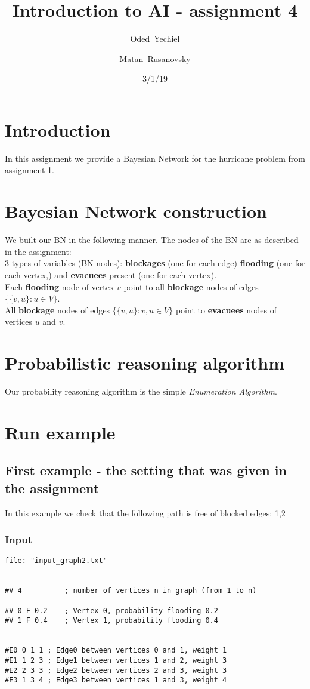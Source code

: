 \documentclass{article}                     %
\begin{document}
	
\title{Introduction to AI - assignment 4}


\author{Oded~Yechiel         \and
	Matan~Rusanovsky
}

\date{3/1/19}

\maketitle

\section{Introduction}
	In this assignment we provide a Bayesian Network for the hurricane problem from assignment 1.

\section{Bayesian Network construction}
We built our BN in the following manner. The nodes of the BN are as described in the assignment: \\
3 types of variables (BN nodes): \textbf{blockages} (one for each edge) \textbf{flooding} (one for each vertex,) and \textbf{evacuees} present (one for each vertex). \\
Each \textbf{flooding} node of vertex $v$ point to all \textbf{blockage} nodes of edges $\{\{v,u\} : u \in V\}$. \\
All \textbf{blockage} nodes of edges $\{\{v,u\} : v,u \in V\}$ point to \textbf{evacuees} nodes of vertices $u$ and $v$.

\section{Probabilistic reasoning algorithm}
Our probability reasoning algorithm is the simple \textit{Enumeration Algorithm}. 

\section{Run example}
\subsection{First example - the setting that was given in the assignment}
In this example we check that the following path is free of blocked edges: 1,2
\subsubsection{Input}
\begin{verbatim}
file: "input_graph2.txt"


#V 4          ; number of vertices n in graph (from 1 to n)

#V 0 F 0.2    ; Vertex 0, probability flooding 0.2
#V 1 F 0.4    ; Vertex 1, probability flooding 0.4


#E0 0 1 1 ; Edge0 between vertices 0 and 1, weight 1
#E1 1 2 3 ; Edge1 between vertices 1 and 2, weight 3
#E2 2 3 3 ; Edge2 between vertices 2 and 3, weight 3
#E3 1 3 4 ; Edge3 between vertices 1 and 3, weight 4
\end{verbatim}
\end{document}
